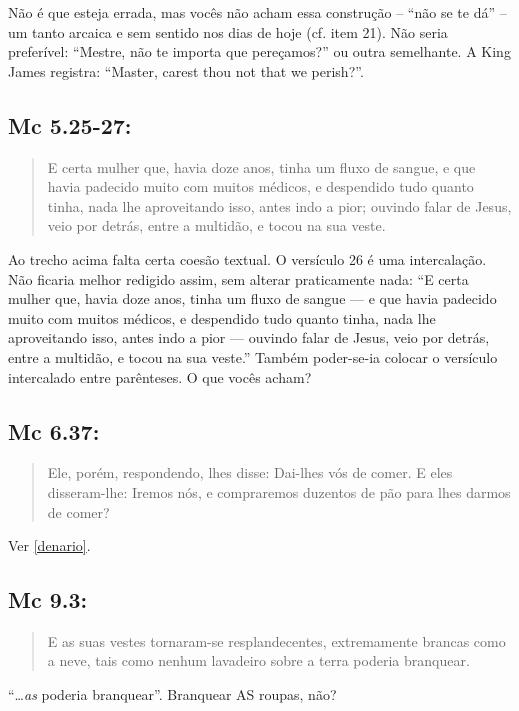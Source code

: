 Não é que esteja errada, mas vocês não acham essa construção -- ``não
se te dá'' -- um tanto arcaica e sem sentido nos dias de hoje (cf.
item 21). Não seria preferível: ``Mestre, não te importa que
pereçamos?'' ou outra semelhante. A King James registra: ``Master,
carest thou not that we perish?''.


\subsection*{Mc 5.25-27:}
\begin{quote}
    \small
E certa mulher que, havia doze anos,  tinha um fluxo de sangue, e que havia padecido muito  com muitos médicos, e despendido tudo quanto tinha, nada lhe  aproveitando isso, antes indo a pior; ouvindo falar  de Jesus, veio por detrás, entre a multidão, e tocou na sua veste.
\end{quote}

Ao trecho acima falta certa coesão textual. O versículo 26 é uma
intercalação. Não ficaria melhor redigido assim, sem alterar
praticamente nada: ``E certa mulher que, havia doze
anos, tinha um fluxo de sangue --- e que havia padecido
muito com muitos médicos, e despendido tudo quanto tinha, nada lhe
aproveitando isso, antes indo a pior --- ouvindo falar
de Jesus, veio por detrás, entre a multidão, e tocou na sua veste.'' Também poder-se-ia colocar o versículo intercalado entre parênteses. O que vocês acham?


\subsection*{Mc 6.37:}
\begin{quote}
    \small
Ele, porém, respondendo, lhes disse: Dai-lhes vós de
 comer. E eles disseram-lhe: Iremos nós, e compraremos
duzentos  de pão para lhes darmos de comer?
\end{quote}
Ver \ref{denario}.


\subsection*{Mc 9.3:}
\begin{quote}
    \small
E as suas vestes tornaram-se resplandecentes, extremamente brancas como a neve, tais como nenhum lavadeiro sobre a terra  poderia branquear.
\end{quote}

``\ldots \emph{as} poderia branquear''. Branquear AS roupas, não?


